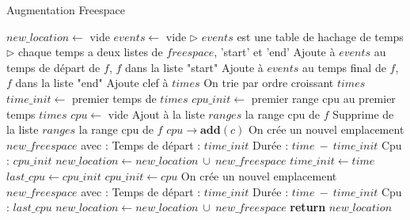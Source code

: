 \documentclass{report}
\begin{document}
\begin{algorithm}
\caption{Augmentation Freespace}\label{extend_freespace}
\begin{algorithmic}[1]
	\State $new\_location \gets$ vide
	\State $events \gets$ vide
	\State
	\State \(\triangleright\) $events$ est une table de hachage de temps
	\State \(\triangleright\) chaque temps a deux listes de $freespace$, 'start' et 'end'
	\State
		\State Ajoute à $events$ au temps de départ de $f$, $f$ dans la liste "start"
		\State Ajoute à $events$ au temps final de $f$, $f$ dans la liste "end"
	\EndFor
	\State
		\State Ajoute clef à $times$	
	\EndFor
	\State
	\State On trie par ordre croissant $times$
	\State $time\_init \gets$ premier temps de $times$
	\State $cpu\_init \gets$ premier range cpu au premier temps $times$
	\State
		\State $cpu \gets$ vide
		\State
			\State Ajout à la liste $ranges$ la range cpu de $f$
		\EndFor
		\State
			\State Supprime de la liste $ranges$ la range cpu de $f$
		\EndFor
		\State
			\State $cpu \rightarrow\textbf{add}(c)$
		\EndFor
		\State
			\State On crée un nouvel emplacement $new\_freespace$ avec :
				\State \hspace{\algorithmicindent} Temps de départ : $time\_init$
				\State \hspace{\algorithmicindent} Durée : $time\ -\ time\_init$
				\State \hspace{\algorithmicindent} Cpu : $cpu\_init$
			\State $new\_location \gets new\_location\ \cup\ new\_freespace$ 
			\State $time\_init \gets time$
		\EndIf
		\State $last\_cpu \gets cpu\_init$
		\State $cpu\_init \gets cpu$
	\EndFor
	\State
	\State On crée un nouvel emplacement $new\_freespace$ avec :
		\State \hspace{\algorithmicindent} Temps de départ : $time\_init$
		\State \hspace{\algorithmicindent} Durée : $time\ -\ time\_init$
		\State \hspace{\algorithmicindent} Cpu : $last\_cpu$
	\State $new\_location \gets new\_location\ \cup\ new\_freespace$ 
	\State
	\State \textbf{return} $new\_location$
\EndFunction
\end{algorithmic}
\end{algorithm}
\end{document}
